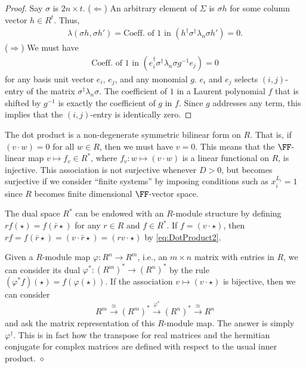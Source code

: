 \begin{proof}
Say $\sigma$ is $2n \times t$.
($\Leftarrow$)
An arbitrary element of $\Sigma$ is $\sigma h$ for some column vector $h \in R^t$.
Thus, 
\begin{align*}
 \lambda( \sigma h, \sigma h' ) = \text{Coeff. of 1 in }( h^\dagger \sigma^\dagger \lambda_n \sigma h' ) = 0 .
\end{align*}
($\Rightarrow$)
We must have
\begin{align*}
\text{Coeff. of 1 in }( e_i^\dagger \sigma^\dagger \lambda_n \sigma g^{-1} e_j ) = 0 
\end{align*}
for any basis unit vector $e_i$, $e_j$, and any monomial $g$.
$e_i$ and $e_j$ selects $(i,j)$-entry of the matrix $\sigma^\dagger \lambda_n \sigma$.
The coefficient of $1$ in a Laurent polynomial $f$ 
that is shifted by $g^{-1}$ is exactly the coefficient of $g$ in $f$.
Since $g$ addresses any term,
this implies that the $(i,j)$-entry is identically zero.
\end{proof}


\begin{rem}
The dot product is a non-degenerate symmetric bilinear form on $R$.
That is, if $(v \cdot w ) = 0$ for all $w \in R$, then we must have $v = 0$.
This means that the $\FF$-linear map $v \mapsto f_v \in R^*$, 
where $f_v: w \mapsto (v \cdot w)$ is a linear functional on $R$,
is injective.
This association is not surjective whenever $D > 0$,
but becomes surjective if we consider ``finite systems''
by imposing conditions such as $x_i^{L_i} = 1$
since $R$ becomes finite dimensional $\FF$-vector space.

The dual space $R^*$ can be endowed with an $R$-module structure
by defining $r f( \star ) = f( \bar r \star )$ for any $r \in R$ and $f \in R^*$.
If $f = (v \cdot \star)$, then $r f = f( \bar r \star ) = (v \cdot \bar r \star) = (rv \cdot \star)$ 
by \eqref{eq:DotProduct2}.

Given a $R$-module map $\varphi : R^n \to R^m$, i.e., an $m \times n$ matrix with entries in $R$,
we can consider its dual $\varphi^* : (R^m)^* \to (R^n)^*$ by the rule
$(\varphi^* f)(\star) = f( \varphi(\star))$.
If the association $v \mapsto (v \cdot \star)$ is bijective,
then we can consider 
\[
R^m \xrightarrow{\cong} (R^m)^* \xrightarrow{\varphi^*} (R^n)^* \xrightarrow{\cong} R^n
\]
and ask the matrix representation of this $R$-module map.
The answer is simply $\varphi^\dagger$.
This is in fact how the transpose for real matrices and the hermitian conjugate for complex matrices
are defined with respect to the usual inner product.
\hfill $\diamond$ \end{rem}

